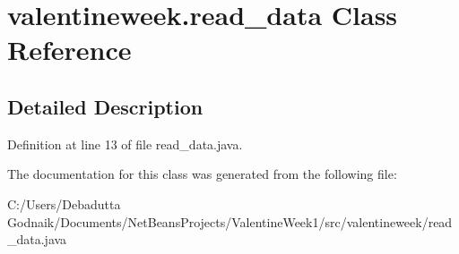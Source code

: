 \hypertarget{classvalentineweek_1_1read__data}{}\section{valentineweek.\+read\+\_\+data Class Reference}
\label{classvalentineweek_1_1read__data}


\subsection{Detailed Description}


Definition at line 13 of file read\+\_\+data.\+java.



The documentation for this class was generated from the following file\+:\begin{DoxyCompactItemize}
\item 
C\+:/\+Users/\+Debadutta Godnaik/\+Documents/\+Net\+Beans\+Projects/\+Valentine\+Week1/src/valentineweek/read\+\_\+data.\+java\end{DoxyCompactItemize}
